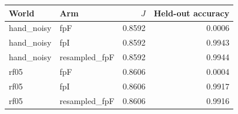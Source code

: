 \begin{tabular}{llrr}
\toprule
World & Arm & $J$ & Held-out accuracy \\
\midrule
hand\_noisy & fpF & 0.8592 & 0.0006 \\
hand\_noisy & fpI & 0.8592 & 0.9943 \\
hand\_noisy & resampled\_fpF & 0.8592 & 0.9944 \\
rf05 & fpF & 0.8606 & 0.0004 \\
rf05 & fpI & 0.8606 & 0.9917 \\
rf05 & resampled\_fpF & 0.8606 & 0.9916 \\
\bottomrule
\end{tabular}

